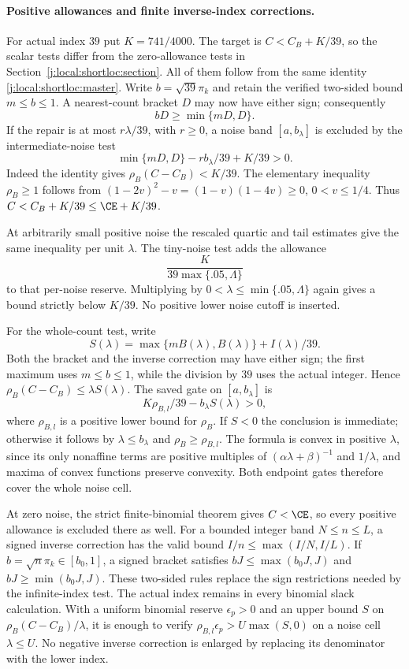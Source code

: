 \paragraph{Positive allowances and finite inverse-index corrections.}
\label{j:local:allowance}
For actual index $39$ put $K=741/4000$. The target is
$C< C_B+K/39$, so the scalar tests differ from
the zero-allowance tests in Section~\ref{j:local:shortloc:section}.
All of them follow from the same identity
\eqref{j:local:shortloc:master}. Write $b=\sqrt{39}\pi_k$ and retain
the verified two-sided bound $m\le b\le1$. A nearest-count
bracket $D$ may now have either sign; consequently
\[
 bD\ge\min\{mD,D\}.
\]
If the repair is at most $r\lambda/39$, with $r\ge0$, a noise
band $[a,b_\lambda]$ is excluded by the intermediate-noise test
\[
 \min\{mD,D\}-r b_\lambda/39+K/39>0.
\]
Indeed the identity gives $\rho_B(C-C_B)<K/39$.
The elementary inequality $\rho_B\ge1$ follows from
$(1-2v)^2-v=(1-v)(1-4v)\ge0$, $0<v\le1/4$.
Thus $C<C_B+K/39\le\CE+K/39$.

At arbitrarily small positive noise the rescaled quartic and tail
estimates give the same inequality per unit $\lambda$. The tiny-noise
test adds the allowance
\[
             \frac{K}{39\max\{.05,\Lambda\}}
\]
to that per-noise reserve. Multiplying by
$0<\lambda\le\min\{.05,\Lambda\}$ again gives a bound
strictly below $K/39$. No positive lower noise cutoff is inserted.

For the whole-count test, write
\[
 S(\lambda)=\max\{mB(\lambda),B(\lambda)\}
                         +I(\lambda)/39.
\]
Both the bracket and the inverse correction may have either sign;
the first maximum uses $m\le b\le1$, while the division by $39$
uses the actual integer. Hence
$\rho_B(C-C_B)\le\lambda S(\lambda)$.
The saved gate on $[a,b_\lambda]$ is
\[
        K\rho_{B,l}/39-b_\lambda S(\lambda)>0,
\]
where $\rho_{B,l}$ is a positive lower bound for $\rho_B$.
If $S<0$ the conclusion is immediate; otherwise it follows by
$\lambda\le b_\lambda$ and $\rho_B\ge\rho_{B,l}$.
The formula is convex in positive $\lambda$, since its only
nonaffine terms are positive multiples of
$(\alpha\lambda+\beta)^{-1}$ and $1/\lambda$, and maxima of
convex functions preserve convexity. Both endpoint gates therefore
cover the whole noise cell.



At zero noise, the strict finite-binomial theorem gives $C<\CE$,
so every positive allowance is excluded there as well.
For a bounded integer band $N\le n\le L$, a signed inverse correction
has the valid bound $I/n\le\max(I/N,I/L)$. If
$b=\sqrt n\pi_k\in[b_0,1]$, a signed bracket satisfies
$bJ\le\max(b_0J,J)$ and $bJ\ge\min(b_0J,J)$.
These two-sided rules replace the sign restrictions needed by the
infinite-index test. The actual index remains in every binomial slack
calculation. With a uniform binomial reserve $\epsilon_p>0$ and an
upper bound $S$ on $\rho_B(C-C_B)/\lambda$, it is enough to verify
$\rho_{B,l}\epsilon_p>U\max(S,0)$ on a noise cell $\lambda\le U$.
No negative inverse correction is enlarged by replacing its denominator
with the lower index.

